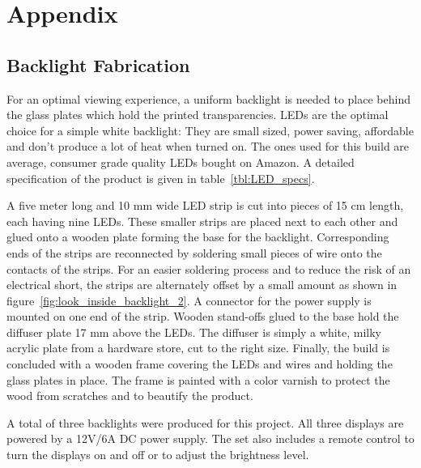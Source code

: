 \chapter{Appendix}
\label{chp:appendix}

\section{Backlight Fabrication}

For an optimal viewing experience, a uniform backlight is needed to place behind the glass plates which hold the printed transparencies.
LEDs are the optimal choice for a simple white backlight: They are small sized, power saving, affordable and don't produce a lot of heat when turned on.
The ones used for this build are average, consumer grade quality LEDs bought on Amazon.
A detailed specification of the product is given in table~\ref{tbl:LED_specs}.

A five meter long and 10 mm wide LED strip is cut into pieces of 15 cm length, each having nine LEDs.
These smaller strips are placed next to each other and glued onto a wooden plate forming the base for the backlight.
Corresponding ends of the strips are reconnected by soldering small pieces of wire onto the contacts of the strips.
For an easier soldering process and to reduce the risk of an electrical short, the strips are alternately offset by a small amount as shown in figure~\ref{fig:look_inside_backlight_2}.
A connector for the power supply is mounted on one end of the strip.
Wooden stand-offs glued to the base hold the diffuser plate 17 mm above the LEDs.
The diffuser is simply a white, milky acrylic plate from a hardware store, cut to the right size.
Finally, the build is concluded with a wooden frame covering the LEDs and wires and holding the glass plates in place.
The frame is painted with a color varnish to protect the wood from scratches and to beautify the product.

A total of three backlights were produced for this project.
All three displays are powered by a 12V/6A DC power supply.
The set also includes a remote control to turn the displays on and off or to adjust the brightness level.

